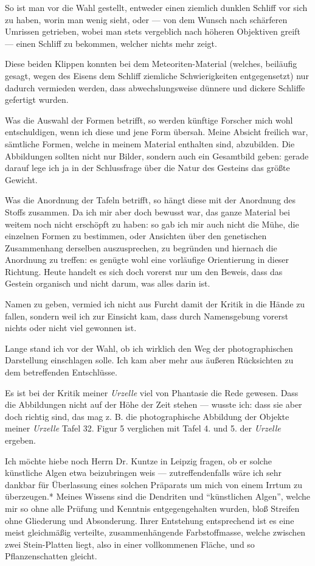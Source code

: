 \documentclass[a4paper, 12pt, oneside]{article}
\begin{document}
So ist man vor die Wahl gestellt, entweder einen ziemlich dunklen Schliff vor sich zu haben, worin man wenig sieht, oder — von dem Wunsch nach schärferen Umrissen getrieben, wobei man stets vergeblich nach höheren Objektiven greift — einen Schliff zu bekommen, welcher nichts mehr zeigt.

Diese beiden Klippen konnten bei dem Meteoriten-Material (welches, beiläufig gesagt, wegen des Eisens dem Schliff ziemliche Schwierigkeiten entgegensetzt) nur dadurch vermieden werden, dass abwechslungsweise dünnere und dickere Schliffe gefertigt wurden.

Was die Auswahl der Formen betrifft, so werden künftige Forscher mich wohl entschuldigen, wenn ich diese und jene Form übersah. Meine Absicht freilich war, sämtliche Formen, welche in meinem Material enthalten sind, abzubilden. Die Abbildungen sollten nicht nur Bilder, sondern auch ein Gesamtbild geben: gerade darauf lege ich ja in der Schlussfrage über die Natur des Gesteins das größte Gewicht.

Was die Anordnung der Tafeln betrifft, so hängt diese mit der Anordnung des Stoffs zusammen. Da ich mir aber doch bewusst war, das ganze Material bei weitem noch nicht erschöpft zu haben: so gab ich mir auch nicht die Mühe, die einzelnen Formen zu bestimmen, oder Ansichten über den genetischen Zusammenhang derselben auszusprechen, zu begründen und hiernach die Anordnung zu treffen: es genügte wohl eine vorläufige Orientierung in dieser Richtung. Heute handelt es sich doch vorerst nur um den Beweis, dass das Gestein organisch und nicht darum, was alles darin ist.

Namen zu geben, vermied ich nicht aus Furcht damit der Kritik in die Hände zu fallen, sondern weil ich zur Einsicht kam, dass durch Namensgebung vorerst nichts oder nicht viel gewonnen ist.

Lange stand ich vor der Wahl, ob ich wirklich den Weg der photographischen Darstellung einschlagen solle. Ich kam aber mehr aus äußeren Rücksichten zu dem betreffenden Entschlüsse.

Es ist bei der Kritik meiner \emph{Urzelle} viel von Phantasie die Rede gewesen. Dass die Abbildungen nicht auf der Höhe der Zeit stehen — wusste ich: dass sie aber doch richtig sind, das mag z. B. die photographische Abbildung der Objekte meiner \emph{Urzelle} Tafel 32. Figur 5 verglichen mit Tafel 4. und 5. der \emph{Urzelle} ergeben.

Ich möchte hiebe noch Herrn Dr. Kuntze in Leipzig fragen, ob er solche künstliche Algen etwa beizubringen weis — zutreffendenfalls wäre ich sehr dankbar für Überlassung eines solchen Präparats um mich von einem Irrtum zu überzeugen.* Meines Wissens sind die Dendriten und "`künstlichen Algen"', welche mir so ohne alle Prüfung und Kenntnis entgegengehalten wurden, bloß Streifen ohne Gliederung und Absonderung. Ihrer Entstehung entsprechend ist es eine meist gleichmäßig verteilte, zusammenhängende Farbstoffmasse, welche zwischen zwei Stein-Platten liegt, also in einer vollkommenen Fläche, und so Pflanzenschatten gleicht.
\end{document}
